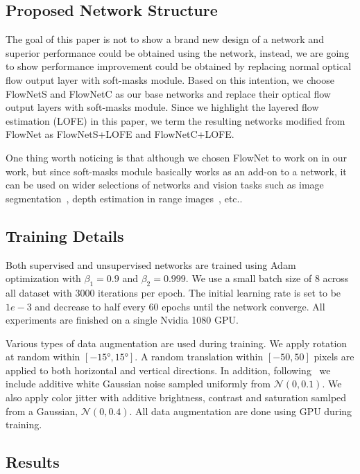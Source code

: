 \documentclass[10pt,twocolumn,letterpaper]{article}
\begin{document}
\subsection{Proposed Network Structure}
The goal of this paper is not to show a brand new design of a network and superior performance could be obtained using the network, instead, we are going to show performance improvement could be obtained by replacing normal optical flow output layer with soft-masks module. Based on this intention, we choose FlowNetS and FlowNetC as our base networks and replace their optical flow output layers with soft-masks module. Since we highlight the layered flow estimation (LOFE) in this paper, we term the resulting networks modified from FlowNet as FlowNetS+LOFE and FlowNetC+LOFE. 

One thing worth noticing is that although we chosen FlowNet to work on in our work, but since soft-masks module basically works as an add-on to a network, it can be used on wider selections of networks and vision tasks such as image segmentation~\cite{long2015fully}\cite{noh2015learning}, depth estimation in range images~\cite{eigen2014depth}\cite{eigen2015predicting}, etc..

\subsection{Training Details}
Both supervised and unsupervised networks are trained using Adam~\cite{kingma2014adam} optimization with $\beta_1=0.9$ and $\beta_2=0.999$. We use a small batch size of 8 across all dataset with 3000 iterations per epoch. The initial learning rate is set to be $1e-3$ and decrease to half every 60 epochs until the network converge. All experiments are finished on a single Nvidia 1080 GPU.

Various types of data augmentation are used during training. We apply rotation at random within $[\ang{-15}, \ang{15}]$. A random translation within $[-50, 50]$ pixels are applied to both horizontal and vertical directions. In addition, following~\cite{Ranjan_2017_CVPR} we include additive white Gaussian noise sampled uniformly from $\mathcal{N}(0, 0.1)$. We also apply color jitter with additive brightness, contrast and saturation samlped from a Gaussian, $\mathcal{N}(0, 0.4)$. All data augmentation are done using GPU during training.

\subsection{Results}
\end{document}

